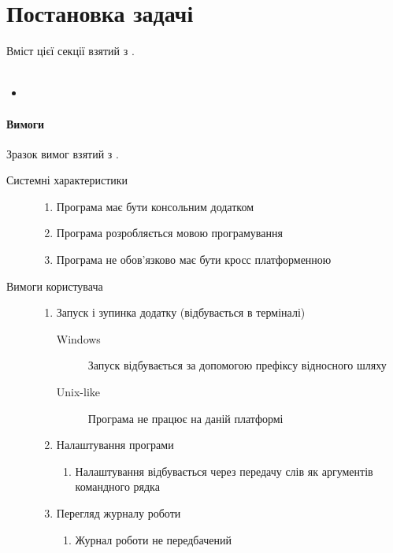 \sffamily

\section{Постановка задачі}
Вміст цієї секції взятий з \cite{CSHPiskunov}.\\
\\
\begin{itemize}
	\item
\end{itemize}

\paragraph{Вимоги}
Зразок вимог взятий з \cite{kulikov}. 
\begin{description}
	\item[Системні характеристики]\directenv
		\begin{enumerate}
			\item Програма має бути консольним додатком
			\item Програма розробляється мовою програмування  
			\item Програма не обов'язково має бути кросс платформенною
		\end{enumerate}
	\item[Вимоги користувача]\directenv
		\begin{enumerate}
			\item Запуск і зупинка додатку (відбувається в терміналі)
				\begin{description}
					\item[Windows]
						Запуск відбувається за допомогою префіксу відносного шляху 
					\item[Unix-like]
						Програма не працює на даній платформі
				\end{description}
			\item Налаштування програми
				\begin{enumerate}
					\item Налаштування відбувається через передачу слів як аргументів командного рядка
				\end{enumerate}
			\item Перегляд журналу роботи
				\begin{enumerate}
					\item Журнал роботи не передбачений
				\end{enumerate}

\end{enumerate}
\end{description}
